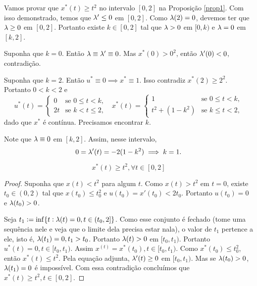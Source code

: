 Vamos provar que $x^*(t) \ge t^2$ no intervalo $[0,2]$ na Proposição
\ref{prop1}. Com isso demonstrado, temos que $\lambda ' \le 0$ em $[0,2]$. Como
$\lambda(2) = 0$, devemos ter que $\lambda \ge 0$ em $[0,2]$. Portanto existe $k \in
[0,2]$ tal que $\lambda > 0$ em $[0,k)$ e $\lambda = 0$ em $[k,2]$. 

Suponha que $k = 0$. Então $\lambda \equiv \lambda ' \equiv 0$. Mas $x^*(0) > 0^2$,
então $\lambda '(0) < 0$, contradição. 

Suponha que $k = 2$. Então $u^* \equiv 0 \implies x^* \equiv 1$. Isso
contradiz $x^*(2) \ge 2^2$. Portanto $0 < k < 2$ e 
\begin{equation}
    \label{eq1:u-star}
    u^*(t) = \begin{cases}
        0 &\text{se }0 \le t < k, \\
        2t &\text{se }k < t \le 2, 
    \end{cases}\text{  }x^*(t) = \begin{cases}
        1 &\text{se }0 \le t < k, \\
        t^2 + (1 - k^2) &\text{se }k \le t < 2,
    \end{cases}    
\end{equation}
dado que $x^*$ é contínua. Precisamos encontrar $k$. 

Note que $\lambda \equiv 0$ em $[k,2]$. Assim, nesse intervalo, 
$$
0 = \lambda '(t) = - 2(1 - k^2) \implies k = 1.
$$

\begin{proposition}
    \label{prop1}
    $$x^*(t) \ge t^2, \forall t \in [0,2]$$
\end{proposition}

\begin{proof}
    Suponha que $x(t) < t^2$ para algum $t$. Como $x(t) > t^2$ em $t=0$,
    existe $t_0 \in (0,2)$ tal que $x(t_0) \le t_0^2$ e $u(t_0) = x'(t_0) <
    2t_0$. Portanto $u(t_0) = 0$ e $\lambda(t_0) > 0$. 

    Seja $t_1 := \inf\{t: \lambda(t) = 0, t \in (t_0, 2]\}$. Como esse conjunto é
    fechado (tome uma sequência nele e veja que o limite dela precisa estar
    nala), o valor de $t_1$ pertence a ele, isto é, $\lambda(t_1) = 0, t_1 > t_0$.
    Portanto $\lambda(t) > 0$ em $[t_0, t_1)$. Portanto $u^*(t) = 0, t \in [t_0,
    t_1)$. Assim $x^(t) = x^*(t_0), t \in [t_0, t_1)$. Como $x^*(t_0) \le
    t_0^2$, então $x^*(t) \le t^2$. Pela equação adjunta, $\lambda '(t) \ge 0$ em
    $[t_0, t_1)$. Mas se $\lambda(t_0) > 0$, $\lambda(t_1) = 0$ é impossível. Com essa
    contradição concluímos que $x^*(t) \ge t^2, t \in [0,2]$.   
\end{proof}

